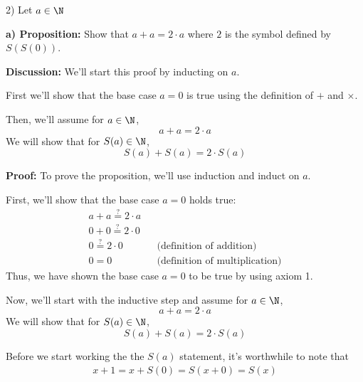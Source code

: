     \begin{paragraph}{2)}
        Let $a \in \N$
        
        \textbf{a) Proposition:} Show that $a + a = 2 \cdot a$ where $2$ is the symbol defined by $S(S(0))$.
        \spacing

        \textbf{Discussion:} We'll start this proof by inducting on $a$.
        \spacing

        First we'll show that the base case $a = 0$ is true using the definition of $+$ and $\times$.
        \spacing

        Then, we'll assume for $a \in \N$,
        $$a + a = 2 \cdot a$$
        We will show that for $S(a) \in \N$,
        $$S(a) + S(a) = 2 \cdot S(a)$$

        \textbf{Proof:} To prove the proposition, we'll use induction and induct on $a$.
        \spacing

        First, we'll show that the base case $a = 0$ holds true:
        \begin{align*}
            a + a \stackrel{?}{=} 2 \cdot a \\
            0 + 0 \stackrel{?}{=} 2 \cdot 0 \\
            0 \stackrel{?}{=} 2 \cdot 0 && \text{(definition of addition)}\\
            0 = 0 && \text{(definition of multiplication)}
        \end{align*}
        Thus, we have shown the base case $a = 0$ to be true by using axiom 1.
        \spacing

        Now, we'll start with the inductive step and assume for $a \in \N$,
        $$a + a = 2 \cdot a$$
        We will show that for $S(a) \in \N$,
        $$S(a) + S(a) = 2 \cdot S(a)$$

        Before we start working the the $S(a)$ statement, it's worthwhile to note that
        \begin{align}x + 1 = x + S(0) = S(x + 0) = S(x)\end{align}


\end{paragraph}
